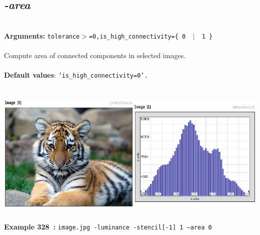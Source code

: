 \documentclass[a4paper,11pt,twoside]{book}
\begin{document}
\subsection{\emph{-area} }\vspace*{-0.5em}
~\\\textbf{Arguments: } 
{\small \texttt{tolerance$>$=0,is\_high\_connectivity=\{ 0 ~$|$~ 1 \}}}\\~\\
Compute area of connected components in selected images.
~\\~\\\textbf{Default values}: {\small \texttt{'is\_high\_connectivity=0'.}}
\begin{center}\includegraphics[keepaspectratio=true,height=7cm,width=\textwidth]{img/gmic_def328.jpg}\\
{\footnotesize \textbf{Example 328~:} \texttt{image.jpg -luminance -stencil[-1] 1 --area 0}}
\end{center}
\end{document}
